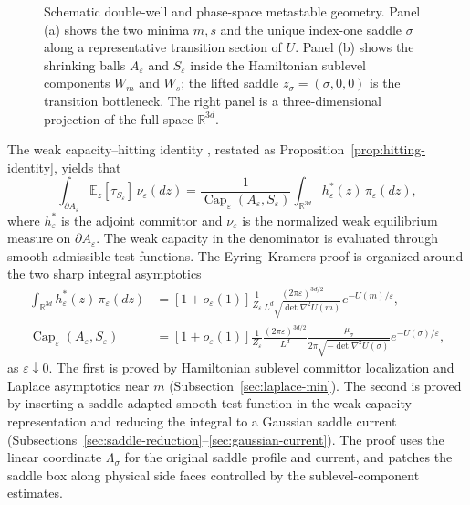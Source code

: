 \documentclass[11pt]{article}
\numberwithin{equation}{section}
\theoremstyle{plain}
\theoremstyle{definition}
\theoremstyle{remark}
\newcommand{\R}{\mathbb R}
\newcommand{\eps}{\varepsilon}
\renewcommand{\Cap}{\operatorname{Cap}}
\newcommand{\E}{\mathbb E}
\begin{document}
\begin{figure}[t]
    \caption{Schematic double-well and phase-space metastable geometry.
    Panel (a) shows the two minima $m,s$ and the unique index-one saddle
    $\sigma$ along a representative transition section of $U$.  Panel (b)
    shows the shrinking balls $A_\eps$ and $S_\eps$ inside the Hamiltonian
    sublevel components $W_m$ and $W_s$; the lifted saddle
    $z_\sigma=(\sigma,0,0)$ is the transition bottleneck.  The right panel is
    a three-dimensional projection of the full space $\mathbb R^{3d}$.
    }
    \label{fig:ek-metastable-geometry}
\end{figure}

The weak capacity--hitting identity
\cite[Proposition~2.49]
{HeLiWangZhu2026WeakEquilibrium}, restated as
Proposition~\ref{prop:hitting-identity}, yields that
\begin{equation}
\label{eq:capacity-hitting-intro}
\int_{\partial A_\eps} \E_z[\tau_{S_\eps}]\,\nu_\eps(dz)
=
\frac{1}{\Cap_\eps(A_\eps,S_\eps)}
\int_{\R^{3d}} h_\eps^*(z)\,\pi_\eps(dz),
\end{equation}
where $h_\eps^*$ is the adjoint committor and $\nu_\eps$ is the normalized weak
equilibrium measure on $\partial A_\eps$.  The weak capacity in the denominator
is evaluated through smooth admissible test functions.  The Eyring--Kramers proof is organized around
the two sharp integral asymptotics
\begin{align}
\label{eq:numerator-asymptotic-intro}
\int_{\R^{3d}} h_\eps^*(z)\,\pi_\eps(dz)
&=
[1+o_\eps(1)]
\frac{1}{Z_\eps}
\frac{(2\pi\eps)^{3d/2}}{L^d\sqrt{\det\nabla^2U(m)}}
e^{-U(m)/\eps},\\
\label{eq:capacity-asymptotic-intro}
\Cap_\eps(A_\eps,S_\eps)
&=
[1+o_\eps(1)]
\frac{1}{Z_\eps}
\frac{(2\pi\eps)^{3d/2}}{L^d}
\frac{\mu_\sigma}{2\pi\sqrt{-\det\nabla^2U(\sigma)}}
e^{-U(\sigma)/\eps},
\end{align}
as $\varepsilon\downarrow 0$.
The first is proved by Hamiltonian sublevel committor localization and Laplace
asymptotics near $m$ (Subsection~\ref{sec:laplace-min}).  The second is proved by
inserting a saddle-adapted smooth test function in the weak capacity
representation and reducing the integral to a Gaussian saddle current
(Subsections~\ref{sec:saddle-reduction}--\ref{sec:gaussian-current}).  The proof
uses the linear coordinate $\Lambda_\sigma$ for the original saddle profile and
current, and patches the saddle box along physical side faces controlled by the
sublevel-component estimates.
\end{document}
